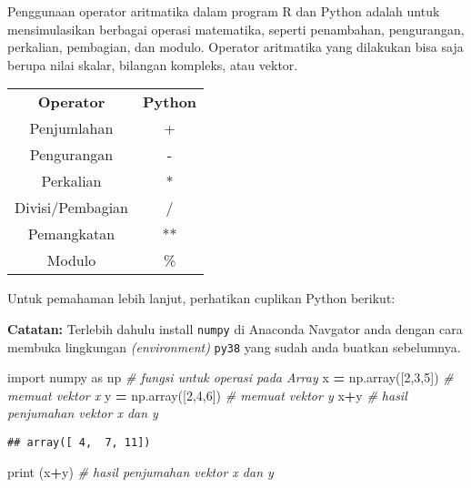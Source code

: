 \documentclass[
]{docs}
\newenvironment{Shaded}{\begin{snugshade}}{\end{snugshade}}
\newcommand{\BuiltInTok}[1]{#1}
\newcommand{\CommentTok}[1]{\textcolor[rgb]{0.56,0.35,0.01}{\textit{#1}}}
\newcommand{\DecValTok}[1]{\textcolor[rgb]{0.00,0.00,0.81}{#1}}
\newcommand{\ImportTok}[1]{#1}
\newcommand{\NormalTok}[1]{#1}
\newcommand{\OperatorTok}[1]{\textcolor[rgb]{0.81,0.36,0.00}{\textbf{#1}}}
\begin{document}
Penggunaan operator aritmatika dalam program R dan Python adalah untuk mensimulasikan berbagai operasi matematika, seperti penambahan, pengurangan, perkalian, pembagian, dan modulo. Operator aritmatika yang dilakukan bisa saja berupa nilai skalar, bilangan kompleks, atau vektor.

\begin{longtable}[]{@{}cc@{}}
\toprule()
\endhead
\textbf{Operator} & \textbf{Python} \\
Penjumlahan & + \\
Pengurangan & - \\
Perkalian & * \\
Divisi/Pembagian & / \\
Pemangkatan & ** \\
Modulo & \% \\
\bottomrule()
\end{longtable}

Untuk pemahaman lebih lanjut, perhatikan cuplikan Python berikut:

\textbf{Catatan:} Terlebih dahulu install \texttt{numpy} di Anaconda Navgator anda dengan cara membuka lingkungan \emph{(environment)} \texttt{py38} yang sudah anda buatkan sebelumnya.

\begin{Shaded}
\begin{Highlighting}[]
\ImportTok{import}\NormalTok{ numpy }\ImportTok{as}\NormalTok{ np      }\CommentTok{\# fungsi untuk operasi pada Array}
\NormalTok{x }\OperatorTok{=}\NormalTok{ np.array([}\DecValTok{2}\NormalTok{,}\DecValTok{3}\NormalTok{,}\DecValTok{5}\NormalTok{])   }\CommentTok{\# memuat vektor x}
\NormalTok{y }\OperatorTok{=}\NormalTok{ np.array([}\DecValTok{2}\NormalTok{,}\DecValTok{4}\NormalTok{,}\DecValTok{6}\NormalTok{])   }\CommentTok{\# memuat vektor y}
\NormalTok{x}\OperatorTok{+}\NormalTok{y                     }\CommentTok{\# hasil penjumahan vektor x dan y}
\end{Highlighting}
\end{Shaded}

\begin{verbatim}
## array([ 4,  7, 11])
\end{verbatim}

\begin{Shaded}
\begin{Highlighting}[]
\BuiltInTok{print}\NormalTok{ (x}\OperatorTok{+}\NormalTok{y)             }\CommentTok{\# hasil penjumahan vektor x dan y}
\end{Highlighting}
\end{Shaded}
\end{document}
